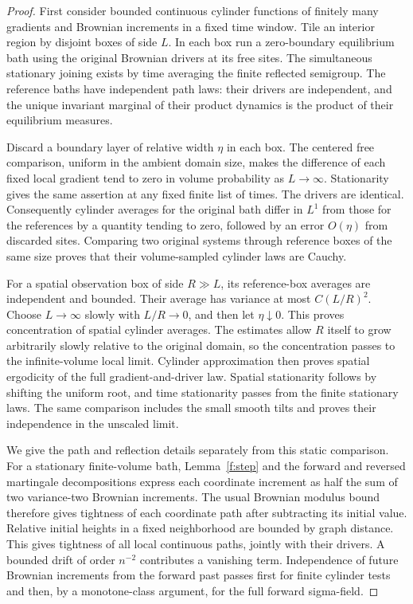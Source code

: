 \begin{proof}
First consider bounded continuous cylinder functions of finitely many
gradients and Brownian increments in a fixed time window. Tile an interior
region by disjoint boxes of side $L$. In each box run a zero-boundary
equilibrium bath using the original Brownian drivers at its free sites.
The simultaneous stationary joining exists by time averaging the finite
reflected semigroup. The reference baths have independent path laws: their
drivers are independent, and the unique invariant marginal of their
product dynamics is the product of their equilibrium measures.

Discard a boundary layer of relative width $\eta$ in each box. The centered
free comparison, uniform in the ambient domain size, makes the difference
of each fixed local gradient tend to zero in volume probability as
$L\to\infty$. Stationarity gives the same assertion at any fixed finite
list of times. The drivers are identical. Consequently cylinder averages
for the original bath differ in $L^1$ from those for the references by a
quantity tending to zero, followed by an error $O(\eta)$ from discarded
sites. Comparing two original systems through reference boxes of the same
size proves that their volume-sampled cylinder laws are Cauchy.

For a spatial observation box of side $R\gg L$, its reference-box averages
are independent and bounded. Their average has variance at most
$C(L/R)^2$. Choose $L\to\infty$ slowly with $L/R\to0$, and then let
$\eta\downarrow0$. This proves concentration of spatial cylinder averages.
The estimates allow $R$ itself to grow arbitrarily slowly relative to the
original domain, so the concentration passes to the infinite-volume local
limit. Cylinder approximation then proves spatial ergodicity of the full
gradient-and-driver law. Spatial stationarity follows by shifting the
uniform root, and time stationarity passes from the finite stationary laws.
The same comparison includes the small smooth tilts and proves their
independence in the unscaled limit.

We give the path and reflection details separately from this static
comparison. For a stationary finite-volume bath, Lemma~\ref{f:step}
and the forward and reversed
martingale decompositions express each coordinate increment as half the
sum of two variance-two Brownian increments. The usual Brownian modulus
bound therefore gives tightness of each coordinate path after subtracting
its initial value. Relative initial heights in a fixed neighborhood are
bounded by graph distance. This gives tightness of all local continuous
paths, jointly with their drivers. A bounded drift of order $n^{-2}$
contributes a vanishing term. Independence of future Brownian increments
from the forward past passes first for finite cylinder tests and then,
by a monotone-class argument, for the full forward sigma-field.


\end{proof}
